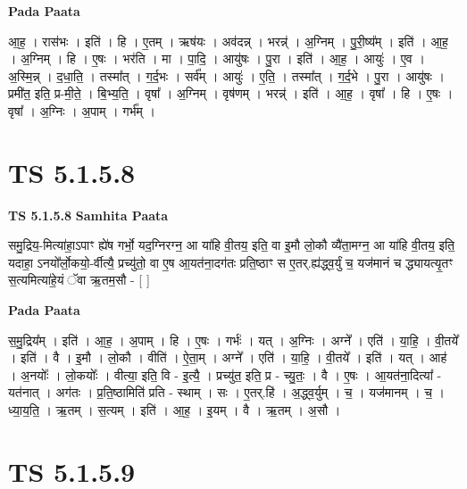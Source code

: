 \documentclass[17pt]{extarticle}
\begin{document}
\textbf{Pada Paata} \newline

आ॒ह॒ । रास॑भः । इति॑ । हि । ए॒तम् । ऋष॑यः । अव॑दन्न् । भरन्न्॑ । अ॒ग्निम् । पु॒री॒ष्य᳚म् । इति॑ । आ॒ह॒ । अ॒ग्निम् । हि । ए॒षः । भर॑ति । मा । पा॒दि॒ । आयु॑षः । पु॒रा । इति॑ । आ॒ह॒ । आयुः॑ । ए॒व । अ॒स्मि॒न्न् । द॒धा॒ति॒ । तस्मा᳚त् । ग॒र्द॒भः । सर्व᳚म् । आयुः॑ । ए॒ति॒ । तस्मा᳚त् । ग॒र्द॒भे । पु॒रा । आयु॑षः । प्रमी॑त॒ इति॒ प्र-मी॒ते॒ । बि॒भ्य॒ति॒ । वृषा᳚ । अ॒ग्निम् । वृष॑णम् । भरन्न्॑ । इति॑ । आ॒ह॒ । वृषा᳚ । हि । ए॒षः । वृषा᳚ । अ॒ग्निः । अ॒पाम् । गर्भ᳚म् ।  \newline





\section{ TS 5.1.5.8 }

\textbf{TS 5.1.5.8 } \newline
\textbf{Samhita Paata} \newline

समु॒द्रिय॒-मित्या॑हा॒ऽपाꣳ ह्ये॑ष गर्भो॒ यद॒ग्निरग्न॒ आ या॑हि वी॒तय॒ इति॒ वा इ॒मौ लो॒कौ व्यै॑ता॒मग्न॒ आ या॑हि वी॒तय॒ इति॒ यदाहा॒ ऽनयो᳚र्लो॒कयो॒-र्वीत्यै॒ प्रच्यु॑तो॒ वा ए॒ष आ॒यत॑ना॒दग॑तः प्रति॒ष्ठाꣳ स ए॒तर्.ह्य॑द्ध्व॒र्युं च॒ यज॑मानं च द्ध्यायत्यृ॒तꣳ स॒त्यमित्या॑हे॒यं ॅवा ऋ॒तम॒सौ - [  ] \newline

\textbf{Pada Paata} \newline

स॒मु॒द्रिय᳚म् । इति॑ । आ॒ह॒ । अ॒पाम् । हि । ए॒षः । गर्भः॑ । यत् । अ॒ग्निः । अग्ने᳚ । एति॑ । या॒हि॒ । वी॒तये᳚ । इति॑ । वै । इ॒मौ । लो॒कौ । वीति॑ । ऐ॒ता॒म् । अग्ने᳚ । एति॑ । या॒हि॒ । वी॒तये᳚ । इति॑ । यत् । आह॑ । अ॒नयोः᳚ । लो॒कयोः᳚ । वीत्या॒ इति॒ वि - इ॒त्यै॒ । प्रच्यु॑त॒ इति॒ प्र - च्यु॒तः॒ । वै । ए॒षः । आ॒यत॑ना॒दित्या᳚ - यत॑नात् । अग॑तः । प्र॒ति॒ष्ठामिति॑ प्रति - स्थाम् । सः । ए॒तर्.हि॑ । अ॒द्ध्व॒र्युम् । च॒ । यज॑मानम् । च॒ । ध्या॒य॒ति॒ । ऋ॒तम् । स॒त्यम् । इति॑ । आ॒ह॒ । इ॒यम् । वै । ऋ॒तम् । अ॒सौ ।  \newline





\section{ TS 5.1.5.9 }
\end{document}
